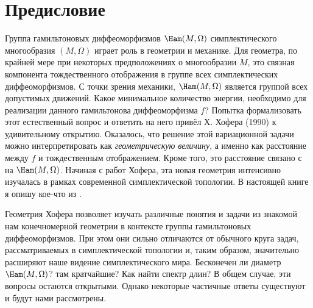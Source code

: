 \chapter*{Предисловие}

Группа гамильтоновых диффеоморфизмов $\Ham(M,\Omega)$ симплектического
многообразия $(M,\Omega)$ играет
 роль в геометрии и
механике.  Для геометра, по крайней мере при некоторых предположениях
о многообразии $M$, это связная компонента тождественного отображения
в группе всех симплектических диффеоморфизмов.  С точки зрения
механики, $\Ham(M,\Omega)$ является группой всех допустимых движений.
Какое минимальное количество энергии, необходимо для реализации
данного гамильтонова диффеоморфизма $f$?  Попытка формализовать этот
естественный вопрос и ответить на него привёл Х. Хофера \cite{H1}
(1990) к удивительному открытию.  Оказалось, что решение этой
вариационной задачи можно интерпретировать как \emph{геометрическую
  величину}, а именно как расстояние между $f$ и тождественным
отображением.  Кроме того, это расстояние связано с  на $\Ham(M,\Omega)$.  Начиная с работ
Хофера, эта новая геометрия интенсивно изучалась в рамках современной
симплектической топологии.  В настоящей книге я опишу кое-что из
.

Геометрия Хофера позволяет изучать различные понятия и задачи из знакомой нам конечномерной геометрии в контексте группы гамильтоновых диффеоморфизмов.
При этом они сильно отличаются от обычного круга задач, рассматриваемых в симплектической топологии и, таким образом, значительно расширяют наше видение симплектического мира.
Бесконечен ли диаметр $\Ham(M,\Omega)$?
 там  кратчайшие?
Как найти спектр длин?
В общем случае, эти вопросы остаются открытыми.
Однако некоторые частичные ответы существуют и будут нами рассмотрены.

